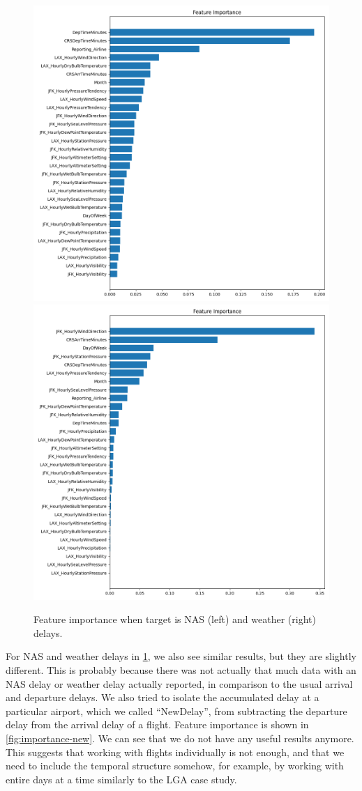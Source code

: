 \begin{figure}
    \centering
    \includegraphics[width=0.49\linewidth]{media/features_NASDelay.png}
    \includegraphics[width=0.49\linewidth]{media/features_WeatherDelay.png}
    \caption{Feature importance when target is NAS (left) and weather (right) delays.}
    \label{fig:importance-nas-weather}
\end{figure}

For NAS and weather delays in \cref{fig:importance-nas-weather}, we also see similar results, but they are slightly different. This is probably because there was not actually that much data with an NAS delay or weather delay actually reported, in comparison to the usual arrival and departure delays. We also tried to isolate the accumulated delay at a particular airport, which we called ``NewDelay'', from subtracting the departure delay from the arrival delay of a flight. Feature importance is shown in \cref{fig:importance-new}. We can see that we do not have any useful results anymore. This suggests that working with flights individually is not enough, and that we need to include the temporal structure somehow, for example, by working with entire days at a time similarly to the LGA case study.

